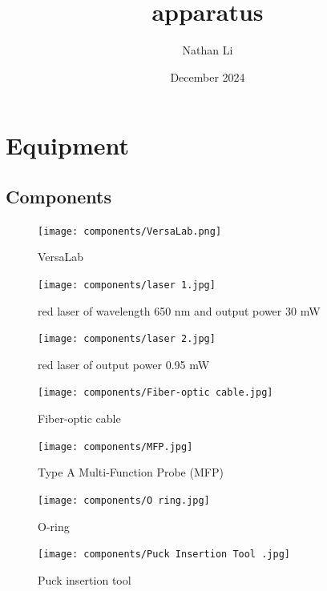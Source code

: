 \documentclass{article}
\title{apparatus}
\author{Nathan Li}
\date{December 2024}
\begin{document}
\maketitle

\section{Equipment}

    \subsection{Components}

    \begin{figure}[H]
        \centering
        \texttt{[image: components/VersaLab.png]}
        \caption{VersaLab}
        \label{Versalab}
    \end{figure}
    
    \begin{figure}[H]
        \centering
        \texttt{[image: components/laser 1.jpg]}
        \caption{red laser of wavelength 650 nm and output power 30 mW}
        \label{laser1}
    \end{figure}

    \begin{figure}[H]
        \centering
        \texttt{[image: components/laser 2.jpg]}
        \caption{red laser of output power 0.95 mW}
        \label{laser2}
    \end{figure}

    \begin{figure}[H]
        \centering
        \texttt{[image: components/Fiber-optic cable.jpg]}
        \caption{Fiber-optic cable}
        \label{fiber}
    \end{figure}

    \begin{figure}[H]
        \centering
        \texttt{[image: components/MFP.jpg]}
        \caption{Type A Multi-Function Probe (MFP)}
        \label{MFP}
    \end{figure}

    \begin{figure}[H]
        \centering
        \texttt{[image: components/O ring.jpg]}
        \caption{O-ring}
        \label{O-ring}
    \end{figure}

    \begin{figure}[H]
        \centering
        \texttt{[image: components/Puck Insertion Tool .jpg]}
        \caption{Puck insertion tool}
        \label{puck tool}
    \end{figure}
\end{document}
